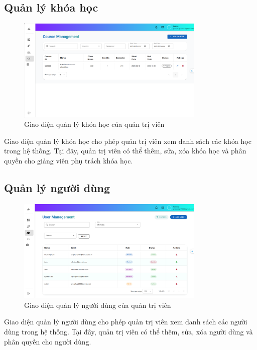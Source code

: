 \subsection{Quản lý khóa học}
\begin{figure}[H]
    \centering
    \includegraphics[width=0.8\textwidth]{images/CapScreen_Admin/course.png}
    \caption{Giao diện quản lý khóa học của quản trị viên}
    \label{fig:admin_course_page}
\end{figure}
Giao diện quản lý khóa học cho phép quản trị viên xem danh sách các khóa học trong hệ thống. Tại đây, quản trị viên có thể thêm, sửa, xóa khóa học và phân quyền cho giảng viên phụ trách khóa học.
\subsection{Quản lý người dùng}
\begin{figure}[H]
    \centering
    \includegraphics[width=0.8\textwidth]{images/CapScreen_Admin/user.png}
    \caption{Giao diện quản lý người dùng của quản trị viên}
    \label{fig:admin_user_page}
\end{figure}
Giao diện quản lý người dùng cho phép quản trị viên xem danh sách các người dùng trong hệ thống. Tại đây, quản trị viên có thể thêm, sửa, xóa người dùng và phân quyền cho người dùng.
